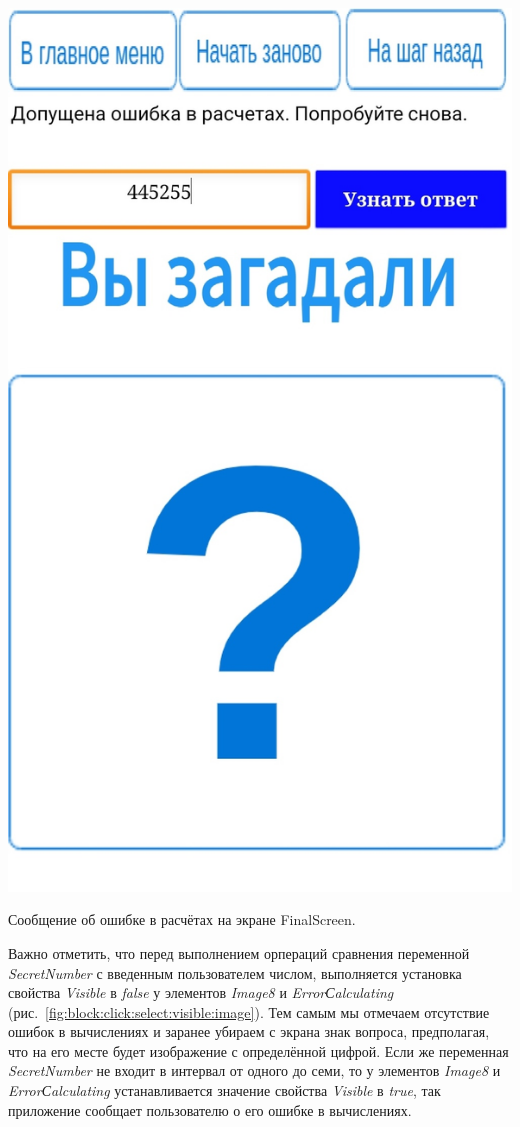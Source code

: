 \begin{marginfigure}[-2em]
\includegraphics{./graphics/programs/guess_numbers/finalScreen_Error_TheGuessingNumbersGame_AppInventor.jpg}
\caption[Сообщение об ошибке в расчётах на экране FinalScreen.]{Сообщение об ошибке в расчётах на экране FinalScreen.}
  \label{fig:block:final:screen:error}
\end{marginfigure}
Важно отметить, что перед выполнением орпераций сравнения переменной \textit{SecretNumber} с введенным пользователем числом, выполняется установка свойства \textit{Visible} в \textit{false} у элементов \textit{Image8} и \textit{ErrorСalculating} (рис.~\ref{fig:block:click:select:visible:image}).
Тем самым мы отмечаем отсутствие ошибок в вычислениях и заранее убираем с экрана знак вопроса, предполагая, что на его месте будет изображение с определённой цифрой. Если же переменная \textit{SecretNumber} не входит в интервал от одного до семи, то у элементов \textit{Image8} и \textit{ErrorСalculating} устанавливается значение свойства \textit{Visible} в \textit{true}, 
так приложение сообщает пользователю о его ошибке в вычислениях.

